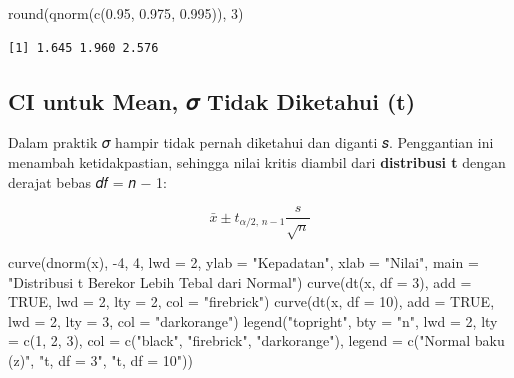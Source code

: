 \documentclass[
  indonesian,
  letterpaper,
]{book}
\newenvironment{Shaded}{\begin{snugshade}}{\end{snugshade}}
\newcommand{\AttributeTok}[1]{\textcolor[rgb]{0.40,0.45,0.13}{#1}}
\newcommand{\ConstantTok}[1]{\textcolor[rgb]{0.56,0.35,0.01}{#1}}
\newcommand{\DecValTok}[1]{\textcolor[rgb]{0.68,0.00,0.00}{#1}}
\newcommand{\FloatTok}[1]{\textcolor[rgb]{0.68,0.00,0.00}{#1}}
\newcommand{\FunctionTok}[1]{\textcolor[rgb]{0.28,0.35,0.67}{#1}}
\newcommand{\NormalTok}[1]{\textcolor[rgb]{0.00,0.23,0.31}{#1}}
\newcommand{\SpecialCharTok}[1]{\textcolor[rgb]{0.37,0.37,0.37}{#1}}
\newcommand{\StringTok}[1]{\textcolor[rgb]{0.13,0.47,0.30}{#1}}
\begin{document}
\begin{Shaded}
\begin{Highlighting}[]
\FunctionTok{round}\NormalTok{(}\FunctionTok{qnorm}\NormalTok{(}\FunctionTok{c}\NormalTok{(}\FloatTok{0.95}\NormalTok{, }\FloatTok{0.975}\NormalTok{, }\FloatTok{0.995}\NormalTok{)), }\DecValTok{3}\NormalTok{)}
\end{Highlighting}
\end{Shaded}

\begin{verbatim}
[1] 1.645 1.960 2.576
\end{verbatim}

\subsection{CI untuk Mean, 𝜎 Tidak Diketahui
(t)}\label{ci-untuk-mean-ux1d70e-tidak-diketahui-t}

Dalam praktik 𝜎 hampir tidak pernah diketahui dan diganti 𝑠. Penggantian
ini menambah ketidakpastian, sehingga nilai kritis diambil dari
\textbf{distribusi t} dengan derajat bebas 𝑑𝑓 = 𝑛 − 1:

\[\bar{x} \pm t_{\alpha/2,\, n-1} \frac{s}{\sqrt{n}}\]

\begin{Shaded}
\begin{Highlighting}[]
\FunctionTok{curve}\NormalTok{(}\FunctionTok{dnorm}\NormalTok{(x), }\SpecialCharTok{{-}}\DecValTok{4}\NormalTok{, }\DecValTok{4}\NormalTok{, }\AttributeTok{lwd =} \DecValTok{2}\NormalTok{, }\AttributeTok{ylab =} \StringTok{"Kepadatan"}\NormalTok{, }\AttributeTok{xlab =} \StringTok{"Nilai"}\NormalTok{,}
\AttributeTok{main =} \StringTok{"Distribusi t Berekor Lebih Tebal dari Normal"}\NormalTok{)}
\FunctionTok{curve}\NormalTok{(}\FunctionTok{dt}\NormalTok{(x, }\AttributeTok{df =} \DecValTok{3}\NormalTok{), }\AttributeTok{add =} \ConstantTok{TRUE}\NormalTok{, }\AttributeTok{lwd =} \DecValTok{2}\NormalTok{, }\AttributeTok{lty =} \DecValTok{2}\NormalTok{, }\AttributeTok{col =} \StringTok{"firebrick"}\NormalTok{)}
\FunctionTok{curve}\NormalTok{(}\FunctionTok{dt}\NormalTok{(x, }\AttributeTok{df =} \DecValTok{10}\NormalTok{), }\AttributeTok{add =} \ConstantTok{TRUE}\NormalTok{, }\AttributeTok{lwd =} \DecValTok{2}\NormalTok{, }\AttributeTok{lty =} \DecValTok{3}\NormalTok{, }\AttributeTok{col =} \StringTok{"darkorange"}\NormalTok{)}
\FunctionTok{legend}\NormalTok{(}\StringTok{"topright"}\NormalTok{, }\AttributeTok{bty =} \StringTok{"n"}\NormalTok{, }\AttributeTok{lwd =} \DecValTok{2}\NormalTok{, }\AttributeTok{lty =} \FunctionTok{c}\NormalTok{(}\DecValTok{1}\NormalTok{, }\DecValTok{2}\NormalTok{, }\DecValTok{3}\NormalTok{), }\AttributeTok{col =} \FunctionTok{c}\NormalTok{(}\StringTok{"black"}\NormalTok{, }\StringTok{"firebrick"}\NormalTok{, }\StringTok{"darkorange"}\NormalTok{),}
\AttributeTok{legend =} \FunctionTok{c}\NormalTok{(}\StringTok{"Normal baku (z)"}\NormalTok{, }\StringTok{"t, df = 3"}\NormalTok{, }\StringTok{"t, df = 10"}\NormalTok{))}
\end{Highlighting}
\end{Shaded}
\end{document}

